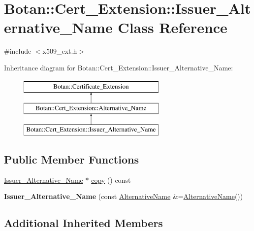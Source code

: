 \hypertarget{classBotan_1_1Cert__Extension_1_1Issuer__Alternative__Name}{\section{Botan\-:\-:Cert\-\_\-\-Extension\-:\-:Issuer\-\_\-\-Alternative\-\_\-\-Name Class Reference}
\label{classBotan_1_1Cert__Extension_1_1Issuer__Alternative__Name}
}


{\ttfamily \#include $<$x509\-\_\-ext.\-h$>$}

Inheritance diagram for Botan\-:\-:Cert\-\_\-\-Extension\-:\-:Issuer\-\_\-\-Alternative\-\_\-\-Name\-:\begin{figure}[H]
\begin{center}
\leavevmode
\includegraphics[height=3.000000cm]{classBotan_1_1Cert__Extension_1_1Issuer__Alternative__Name}
\end{center}
\end{figure}
\subsection*{Public Member Functions}
\begin{DoxyCompactItemize}
\item 
\hyperlink{classBotan_1_1Cert__Extension_1_1Issuer__Alternative__Name}{Issuer\-\_\-\-Alternative\-\_\-\-Name} $\ast$ \hyperlink{classBotan_1_1Cert__Extension_1_1Issuer__Alternative__Name_a7530bc8d232e4c1d5c47013b701e8ad9}{copy} () const 
\item 
\hypertarget{classBotan_1_1Cert__Extension_1_1Issuer__Alternative__Name_abcd45087e65cd6511225add0f76c1f84}{{\bfseries Issuer\-\_\-\-Alternative\-\_\-\-Name} (const \hyperlink{classBotan_1_1AlternativeName}{Alternative\-Name} \&=\hyperlink{classBotan_1_1AlternativeName}{Alternative\-Name}())}\label{classBotan_1_1Cert__Extension_1_1Issuer__Alternative__Name_abcd45087e65cd6511225add0f76c1f84}

\end{DoxyCompactItemize}
\subsection*{Additional Inherited Members}


